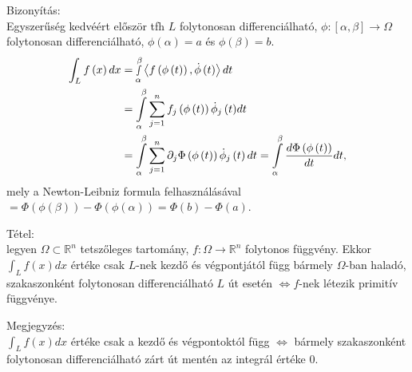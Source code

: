 \documentclass[12pt,a4paper]{scrartcl}
\newenvironment{tetel}{}{}
\newenvironment{bizonyitas}{}{}
\newenvironment{megjegyzes}{}{}
\begin{document}
\begin{bizonyitas}

Bizonyítás:\\
Egyszerűség kedvéért először tfh \(L\) folytonosan differenciálható,
\(\left. \phi:\left\lbrack {\alpha,\beta} \right\rbrack\rightarrow\Omega \right.\)
folytonosan differenciálható, \(\phi\left( \alpha \right) = a\) és
\(\phi\left( \beta \right) = b\). \[\begin{aligned}
  \int_L {f\left( x \right)dx}  &  = \mathop \smallint \limits_\alpha ^\beta  \left\langle {f\left( {\phi \left( t \right)} \right),\dot \phi \left( t \right)} \right\rangle dt \\ 
   &  = \int\limits_\alpha ^\beta  {\sum\limits_{j = 1}^n {{f_j}\left( {\phi \left( t \right)} \right){{\dot \phi }_j}\left( t \right)} dt}  \\ 
   &  = \int\limits_\alpha ^\beta  {\sum\limits_{j = 1}^n {{\partial _j}\Phi \left( {\phi \left( t \right)} \right){{\dot \phi }_j}\left( t \right)dt} }  = \int\limits_\alpha ^\beta  {\frac{{d\Phi \left( {\phi \left( t \right)} \right)}}{{dt}}dt},  \\ 
\end{aligned} \] mely a Newton-Leibniz formula felhasználásával
\(= \Phi\left( {\phi\left( \beta \right)} \right) - \Phi\left( {\phi\left( \alpha \right)} \right) = \Phi\left( b \right) - \Phi\left( a \right)\).

\end{bizonyitas}

\begin{tetel}

Tétel:\\
\protect\hypertarget{zartgorbe}{}{} legyen
\(\Omega \subset {\mathbb{R}}^{n}\) tetszőleges tartomány,
\(\left. f:\Omega\rightarrow{\mathbb{R}}^{n} \right.\) folytonos
függvény. Ekkor \(\int_{L}{f\left( x \right)dx}\) értéke csak \(L\)-nek
kezdő és végpontjától függ bármely \(\Omega\)-ban haladó, szakaszonként
folytonosan differenciálható \(L\) út esetén
\(\left. \Leftrightarrow f \right.\)-nek létezik primitív függvénye.

\end{tetel}

\begin{megjegyzes}

Megjegyzés:\\
\(\int_{L}{f\left( x \right)dx}\) értéke csak a kezdő és végpontoktól
függ \(\Leftrightarrow\) bármely szakaszonként folytonosan
differenciálható zárt út mentén az integrál értéke 0.

\end{megjegyzes}
\end{document}
